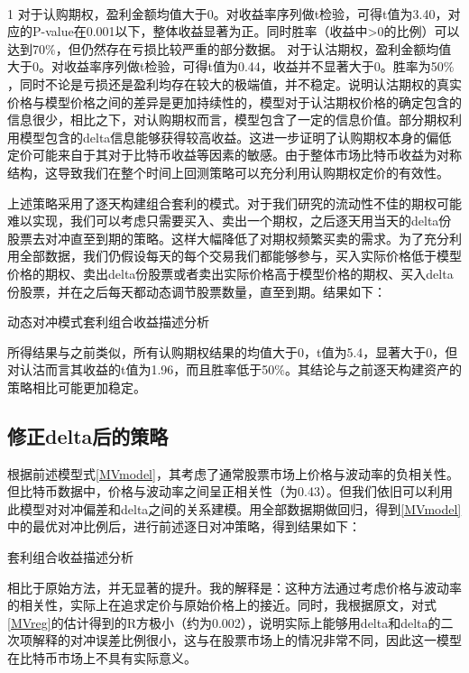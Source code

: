~\\1 
对于认购期权，盈利金额均值大于0。对收益率序列做t检验，可得t值为3.40，对应的P-value在0.001以下，整体收益显著为正。同时胜率（收益中>0的比例）可以达到70$\%$，但仍然存在亏损比较严重的部分数据。
对于认沽期权，盈利金额均值大于0。对收益率序列做t检验，可得t值为0.44，收益并不显著大于0。胜率为50$\%$，同时不论是亏损还是盈利均存在较大的极端值，并不稳定。说明认沽期权的真实价格与模型价格之间的差异是更加持续性的，模型对于认沽期权价格的确定包含的信息很少，相比之下，对认购期权而言，模型包含了一定的信息价值。部分期权利用模型包含的delta信息能够获得较高收益。这进一步证明了认购期权本身的偏低定价可能来自于其对于比特币收益等因素的敏感。由于整体市场比特币收益为对称结构，这导致我们在整个时间上回测策略可以充分利用认购期权定价的有效性。
\par{上述策略采用了逐天构建组合套利的模式。对于我们研究的流动性不佳的期权可能难以实现，我们可以考虑只需要买入、卖出一个期权，之后逐天用当天的delta份股票去对冲直至到期的策略。这样大幅降低了对期权频繁买卖的需求。为了充分利用全部数据，我们仍假设每天的每个交易我们都能够参与，买入实际价格低于模型价格的期权、卖出delta份股票或者卖出实际价格高于模型价格的期权、买入delta份股票，并在之后每天都动态调节股票数量，直至到期。结果如下：
}
\begin{table}[H]
    \caption{动态对冲模式套利组合收益描述分析}
    \centering
    

\end{table}
所得结果与之前类似，所有认购期权结果的均值大于0，t值为5.4，显著大于0，但对认沽而言其收益的t值为1.96，而且胜率低于50$\%$。其结论与之前逐天构建资产的策略相比可能更加稳定。
\subsection{修正delta后的策略}
根据前述模型式\ref{MVmodel}，其考虑了通常股票市场上价格与波动率的负相关性。但比特币数据中，价格与波动率之间呈正相关性（为0.43）。但我们依旧可以利用此模型对对冲偏差和delta之间的关系建模。用全部数据期做回归，得到\ref{MVmodel}中的最优对冲比例后，进行前述逐日对冲策略，得到结果如下：
\begin{table}[H]
    \caption{套利组合收益描述分析}
    \centering
    
    
\end{table}
相比于原始方法，并无显著的提升。我的解释是：这种方法通过考虑价格与波动率的相关性，实际上在追求定价与原始价格上的接近。同时，我根据原文，对式\ref{MVreg}的估计得到的R方极小（约为0.002），说明实际上能够用delta和delta的二次项解释的对冲误差比例很小，这与在股票市场上的情况非常不同，因此这一模型在比特币市场上不具有实际意义。
